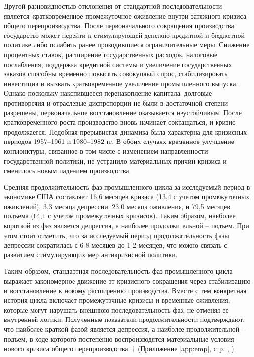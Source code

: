 Другой разновидностью отклонения от стандартной последовательности является кратковременное промежуточное оживление внутри затяжного кризиса общего перепроизводства. После первоначального сокращения производства государство может перейти к стимулирующей денежно-кредитной и бюджетной политике либо ослабить ранее проводившиеся ограничительные меры. Снижение процентных ставок, расширение государственных расходов, налоговые послабления, поддержка кредитной системы и увеличение государственных заказов способны временно повысить совокупный спрос, стабилизировать инвестиции и вызвать кратковременное увеличение промышленного выпуска. Однако поскольку накопившееся перенакопление капитала, долговые противоречия и отраслевые диспропорции не были в достаточной степени разрешены, первоначальное восстановление оказывается неустойчивым. После кратковременного роста производство вновь начинает сокращаться, и кризис продолжается. Подобная прерывистая динамика была характерна для кризисных периодов 1957–1961 и 1980–1982 гг. В обоих случаях временное улучшение конъюнктуры, связанное в том числе с изменением направленности государственной политики, не устранило материальных причин кризиса и сменилось новым падением производства.

Средняя продолжительность фаз промышленного цикла за исследуемый период в экономике США составляет 16,6 месяцев кризиса (13,4 с учетом промежуточных оживлений), 3,3 месяца депрессии, 23,0 месяца оживления, и 79,5 месяцев подъема (64,1 с учетом промежуточных кризисов). Таким образом, наиболее короткой из фаз является депрессия, а наиболее продолжительной – подъем. При этом стоит отметить, что за исследуемый период продолжительность фазы депрессии сократилась с 6-8 месяцев до 1-2 месяцев, что можно связать с развитием стимулирующих мер антикризисной политики.

Таким образом, стандартная последовательность фаз промышленного цикла выражает закономерное движение от кризисного сокращения через стабилизацию и восстановление к новому расширению производства. Вместе с тем конкретная история цикла включает промежуточные кризисы и временные оживления, которые могут нарушать внешнюю последовательность фаз, не отменяя ее внутренней логики. Полученные показатели продолжительности подтверждают, что наиболее краткой фазой является депрессия, а наиболее продолжительной – подъем, в ходе которого постепенно воспроизводятся материальные условия нового кризиса общего перепроизводства. $\dagger$ (Приложение \ref{app:emp}, стр. \pageref{fig:indpro}, \pageref{fig:phases-duration})

